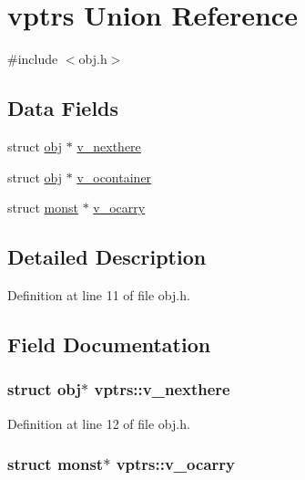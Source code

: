 \hypertarget{unionvptrs}{\section{vptrs Union Reference}
\label{unionvptrs}
}


{\ttfamily \#include $<$obj.\+h$>$}

\subsection*{Data Fields}
\begin{DoxyCompactItemize}
\item 
struct \hyperlink{structobj}{obj} $\ast$ \hyperlink{unionvptrs_a4b7cb1671036b041222f20dbb88467b6}{v\+\_\+nexthere}
\item 
struct \hyperlink{structobj}{obj} $\ast$ \hyperlink{unionvptrs_a7d2dfe2fb22bf3aa653217c7ca691553}{v\+\_\+ocontainer}
\item 
struct \hyperlink{structmonst}{monst} $\ast$ \hyperlink{unionvptrs_aa243cfe3d10e336ba1e0c1dfae721ef0}{v\+\_\+ocarry}
\end{DoxyCompactItemize}


\subsection{Detailed Description}


Definition at line 11 of file obj.\+h.



\subsection{Field Documentation}
\hypertarget{unionvptrs_a4b7cb1671036b041222f20dbb88467b6}{
\subsubsection[{v\+\_\+nexthere}]{\setlength{\rightskip}{0pt plus 5cm}struct {\bf obj}$\ast$ vptrs\+::v\+\_\+nexthere}}\label{unionvptrs_a4b7cb1671036b041222f20dbb88467b6}


Definition at line 12 of file obj.\+h.

\hypertarget{unionvptrs_aa243cfe3d10e336ba1e0c1dfae721ef0}{
\subsubsection[{v\+\_\+ocarry}]{\setlength{\rightskip}{0pt plus 5cm}struct {\bf monst}$\ast$ vptrs\+::v\+\_\+ocarry}}\label{unionvptrs_aa243cfe3d10e336ba1e0c1dfae721ef0}


